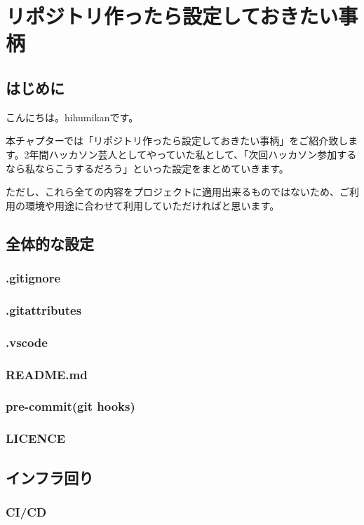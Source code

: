 \chapter{リポジトリ作ったら設定しておきたい事柄}
\section{はじめに}
こんにちは。hihumikanです。

本チャプターでは「リポジトリ作ったら設定しておきたい事柄」をご紹介致します。2年間ハッカソン芸人としてやっていた私として、「次回ハッカソン参加するなら私ならこうするだろう」といった設定をまとめていきます。

ただし、これら全ての内容をプロジェクトに適用出来るものではないため、ご利用の環境や用途に合わせて利用していただければと思います。

\section{全体的な設定}

\subsection{.gitignore}
\subsection{.gitattributes}
\subsection{.vscode}
\subsection{README.md}
\subsection{pre-commit(git hooks)}
\subsection{LICENCE}

\section{インフラ回り}

\subsection{CI/CD}
